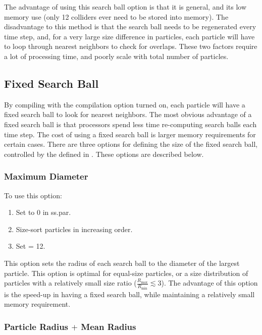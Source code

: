 The advantage of using this search ball option is that it is general,
and its low memory use (only 12 colliders ever need to be stored into
memory). The disadvantage to this method is that the search ball needs
to be regenerated every time step, and, for a very large size
difference in particles, each particle will have to loop through
 nearest neighbors to check for overlaps. These two
factors require a lot of processing time, and poorly scale with total
number of particles.

\subsection{Fixed Search Ball}

By compiling  with the 
compilation option turned on, each particle will have a fixed search
ball to look for nearest neighbors. The most obvious advantage of a
fixed search ball is that processors spend less time re-computing
search balls each time step. The cost of using a fixed search ball is
larger memory requirements for certain cases. There are three options
for defining the size of the fixed search ball, controlled by the
 defined in . These options are
described below.

\subsubsection{Maximum Diameter}

To use this option:
\begin{enumerate}
  \item Set  to 0 in ss.par.
  \item Size-sort particles in increasing order.
  \item Set  = 12.
\end{enumerate}
This option sets the radius of each search ball to the diameter of the
largest particle. This option is optimal for equal-size particles, or
a size distribution of particles with a relatively small size ratio
($\frac{R_{\mathrm{max}}}{R_{\mathrm{min}}} \lesssim 3$). The
advantage of this option is the speed-up in having a fixed search
ball, while maintaining a relatively small memory requirement.

\subsubsection{Particle Radius $+$ Mean Radius}

